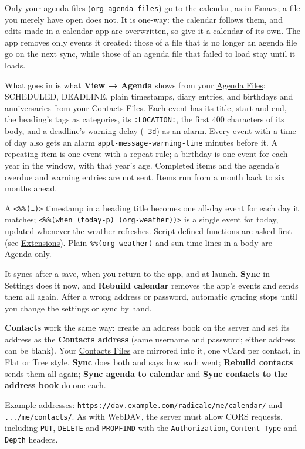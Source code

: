 \documentclass[11pt]{article}
\begin{document}
Only your agenda files (\texttt{org-agenda-files}) go to the calendar, as in Emacs; a file you merely have open does not. It is one-way: the calendar follows them, and edits made in a calendar app are overwritten, so give it a calendar of its own. The app removes only events it created: those of a file that is no longer an agenda file go on the next sync, while those of an agenda file that failed to load stay until it loads.

What goes in is what \textbf{View → Agenda} shows from your \hyperref[sec:org4d24003]{Agenda Files}: SCHEDULED, DEADLINE, plain timestamps, diary entries, and birthdays and anniversaries from your Contacts Files. Each event has its title, start and end, the heading's tags as categories, its \texttt{:LOCATION:}, the first 400 characters of its body, and a deadline's warning delay (\texttt{-3d}) as an alarm. Every event with a time of day also gets an alarm \texttt{appt-message-warning-time} minutes before it. A repeating item is one event with a repeat rule; a birthday is one event for each year in the window, with that year's age. Completed items and the agenda's overdue and warning entries are not sent. Items run from a month back to six months ahead.

A \texttt{<\%\%(…)>} timestamp in a heading title becomes one all-day event for each day it matches; \texttt{<\%\%(when (today-p) (org-weather))>} is a single event for today, updated whenever the weather refreshes. Script-defined functions are asked first (see \hyperref[sec:orgd63a52b]{Extensions}). Plain \texttt{\%\%(org-weather)} and sun-time lines in a body are Agenda-only.

It syncs after a save, when you return to the app, and at launch. \textbf{Sync} in Settings does it now, and \textbf{Rebuild calendar} removes the app's events and sends them all again. After a wrong address or password, automatic syncing stops until you change the settings or sync by hand.

\textbf{Contacts} work the same way: create an address book on the server and set its address as the \textbf{Contacts address} (same username and password; either address can be blank). Your \hyperref[sec:orgba3cd98]{Contacts Files} are mirrored into it, one vCard per contact, in Flat or Tree style. \textbf{Sync} does both and says how each went; \textbf{Rebuild contacts} sends them all again; \textbf{Sync agenda to calendar} and \textbf{Sync contacts to the address book} do one each.

Example addresses: \texttt{https://dav.example.com/radicale/me/calendar/} and \texttt{.../me/contacts/}. As with WebDAV, the server must allow CORS requests, including \texttt{PUT}, \texttt{DELETE} and \texttt{PROPFIND} with the \texttt{Authorization}, \texttt{Content-Type} and \texttt{Depth} headers.
\end{document}
